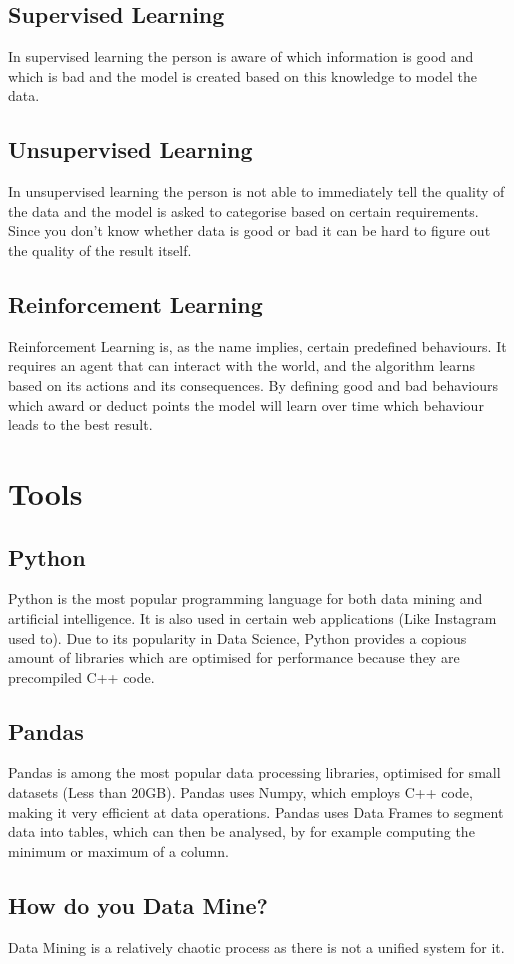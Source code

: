 \documentclass{article}
\begin{document}
	\subsection{Supervised Learning}
	In supervised learning the person is aware of which information is good and which is bad and the model is created based on this knowledge to model the data.
	\subsection{Unsupervised Learning}
	In unsupervised learning the person is not able to immediately tell the quality of the data and the model is asked to categorise based on certain requirements. Since you don't know whether data is good or bad it can be hard to figure out the quality of the result itself.
	\subsection{Reinforcement Learning}
	Reinforcement Learning is, as the name implies, certain predefined behaviours. It requires an agent that can interact with the world, and the algorithm learns based on its actions and its consequences. By defining good and bad behaviours which award or deduct points the model will learn over time which behaviour leads to the best result.
	\section{Tools}
	\subsection{Python}
	Python is the most popular programming language for both data mining and artificial intelligence. It is also used in certain web applications (Like Instagram used to). Due to its popularity in Data Science, Python provides a copious amount of libraries which are optimised for performance because they are precompiled C++ code.
	\subsection{Pandas}
	Pandas is among the most popular data processing libraries, optimised for small datasets (Less than 20GB). Pandas uses Numpy, which employs C++ code, making it very efficient at data operations. Pandas uses Data Frames to segment data into tables, which can then be analysed, by for example computing the minimum or maximum of a column.
	\subsection{How do you Data Mine?}
	Data Mining is a relatively chaotic process as there is not a unified system for it.
\end{document}
